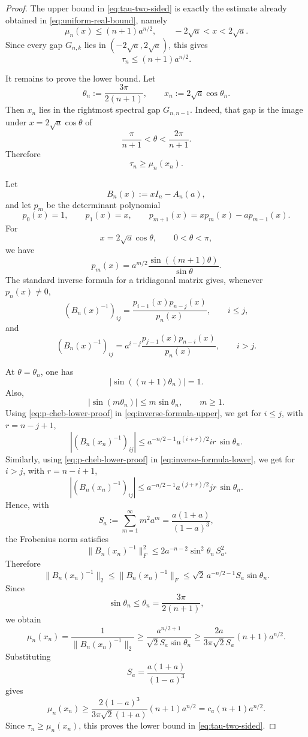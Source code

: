 \documentclass[11pt]{amsart}
\numberwithin{equation}{section}
\begin{document}
\begin{proof}
The upper bound in \eqref{eq:tau-two-sided} is exactly the estimate already obtained in
\eqref{eq:uniform-real-bound}, namely
\[
\mu_n(x)\le (n+1)a^{n/2},
\qquad -2\sqrt a<x<2\sqrt a.
\]
Since every gap \(G_{n,k}\) lies in \((-2\sqrt a,2\sqrt a)\), this gives
\[
\tau_n\le (n+1)a^{n/2}.
\]

It remains to prove the lower bound.  Let
\[
\theta_n:=\frac{3\pi}{2(n+1)},
\qquad
x_n:=2\sqrt a\cos\theta_n.
\]
Then \(x_n\) lies in the rightmost spectral gap \(G_{n,n-1}\).  Indeed, that gap is the image under
\(x=2\sqrt a\cos\theta\) of
\[
\frac{\pi}{n+1}<\theta<\frac{2\pi}{n+1}.
\]
Therefore
\[
\tau_n\ge \mu_n(x_n).
\]

Let
\[
B_n(x):=xI_n-A_n(a),
\]
and let \(p_m\) be the determinant polynomial
\[
p_0(x)=1,\qquad p_1(x)=x,\qquad
p_{m+1}(x)=xp_m(x)-a p_{m-1}(x).
\]
For
\[
x=2\sqrt a\cos\theta,
\qquad 0<\theta<\pi,
\]
we have
\begin{equation}\label{eq:p-cheb-lower-proof}
p_m(x)
=
a^{m/2}
\frac{\sin((m+1)\theta)}{\sin\theta}.
\end{equation}
The standard inverse formula for a tridiagonal matrix gives, whenever \(p_n(x)\ne0\),
\begin{equation}\label{eq:inverse-formula-upper}
(B_n(x)^{-1})_{ij}
=
\frac{p_{i-1}(x)p_{n-j}(x)}{p_n(x)},
\qquad i\le j,
\end{equation}
and
\begin{equation}\label{eq:inverse-formula-lower}
(B_n(x)^{-1})_{ij}
=
a^{i-j}
\frac{p_{j-1}(x)p_{n-i}(x)}{p_n(x)},
\qquad i>j.
\end{equation}

At \(\theta=\theta_n\), one has
\[
|\sin((n+1)\theta_n)|=1.
\]
Also,
\[
|\sin(m\theta_n)|\le m\sin\theta_n,
\qquad m\ge1.
\]
Using \eqref{eq:p-cheb-lower-proof} in \eqref{eq:inverse-formula-upper}, we get for \(i\le j\), with \(r=n-j+1\),
\[
|(B_n(x_n)^{-1})_{ij}|
\le
a^{-n/2-1}a^{(i+r)/2}ir\,\sin\theta_n.
\]
Similarly, using \eqref{eq:p-cheb-lower-proof} in \eqref{eq:inverse-formula-lower}, we get for \(i>j\), with \(r=n-i+1\),
\[
|(B_n(x_n)^{-1})_{ij}|
\le
a^{-n/2-1}a^{(j+r)/2}jr\,\sin\theta_n.
\]
Hence, with
\[
S_a:=\sum_{m=1}^{\infty}m^2a^m
=
\frac{a(1+a)}{(1-a)^3},
\]
the Frobenius norm satisfies
\[
\|B_n(x_n)^{-1}\|_F^2
\le
2a^{-n-2}\sin^2\theta_n\, S_a^2.
\]
Therefore
\[
\|B_n(x_n)^{-1}\|_2
\le
\|B_n(x_n)^{-1}\|_F
\le
\sqrt2\,a^{-n/2-1}S_a\sin\theta_n.
\]
Since
\[
\sin\theta_n
\le
\theta_n
=
\frac{3\pi}{2(n+1)},
\]
we obtain
\[
\mu_n(x_n)
=
\frac1{\|B_n(x_n)^{-1}\|_2}
\ge
\frac{a^{n/2+1}}{\sqrt2 S_a\sin\theta_n}
\ge
\frac{2a}{3\pi\sqrt2 S_a}(n+1)a^{n/2}.
\]
Substituting
\[
S_a=\frac{a(1+a)}{(1-a)^3}
\]
gives
\[
\mu_n(x_n)
\ge
\frac{2(1-a)^3}{3\pi\sqrt2(1+a)}
(n+1)a^{n/2}
=
c_a(n+1)a^{n/2}.
\]
Since \(\tau_n\ge\mu_n(x_n)\), this proves the lower bound in
\eqref{eq:tau-two-sided}.


\end{proof}
\end{document}

